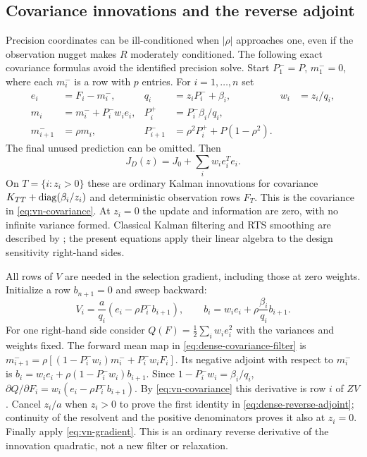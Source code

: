 \subsection{Covariance innovations and the reverse adjoint}
Precision coordinates can be ill-conditioned when $|\rho|$ approaches one,
even if the observation nugget makes $R$ moderately conditioned. The
following exact covariance formulas avoid the identified precision solve.
Start $P_1^-=P$, $m_1^-=0$, where each $m_i^-$ is a row with $p$ entries.
For $i=1,\ldots,n$ set
\begin{align}
 e_i&=F_i-m_i^-,& q_i&=z_iP_i^-+\beta_i,& w_i&=z_i/q_i,\nonumber\\
 m_i&=m_i^-+P_i^-w_i e_i,&
 P_i^+&=P_i^-\beta_i/q_i,\nonumber\\
 m_{i+1}^-&=\rho m_i,&
 P_{i+1}^-&=\rho^2P_i^++P(1-\rho^2).
 \label{eq:dense-covariance-filter}
\end{align}
The final unused prediction can be omitted. Then
\begin{equation}\label{eq:dense-innovation-info}
 J_D(z)=J_0+\sum_i w_i e_i^Te_i.
\end{equation}
On $T=\{i:z_i>0\}$ these are ordinary Kalman innovations for covariance
$K_{TT}+\operatorname{diag}(\beta_i/z_i)$ and deterministic observation rows $F_T$.
This is the covariance in \eqref{eq:vn-covariance}. At $z_i=0$ the update
and information are zero, with no infinite variance formed. Classical Kalman
filtering and RTS smoothing are described by
\citet[Theorems 6.6 and 12.2]{Sarkka2023}; the present equations apply their
linear algebra to the design sensitivity right-hand sides.

All rows of $V$ are needed in the selection gradient, including those at zero
weights. Initialize a row $b_{n+1}=0$ and sweep backward:
\begin{equation}\label{eq:dense-reverse-adjoint}
 V_i=\frac{a}{q_i}(e_i-\rho P_i^-b_{i+1}),\qquad
 b_i=w_ie_i+\rho\frac{\beta_i}{q_i}b_{i+1}.
\end{equation}
For one right-hand side consider
$Q(F)=\frac12\sum_i w_ie_i^2$ with the variances and weights fixed.
The forward mean map in \eqref{eq:dense-covariance-filter} is
$m_{i+1}^-=\rho[(1-P_i^-w_i)m_i^-+P_i^-w_iF_i]$.
Its negative adjoint with respect to $m_i^-$ is
$b_i=w_ie_i+\rho(1-P_i^-w_i)b_{i+1}$.
Since $1-P_i^-w_i=\beta_i/q_i$,
$\partial Q/\partial F_i=w_i(e_i-\rho P_i^-b_{i+1})$.
By \eqref{eq:vn-covariance} this derivative is row $i$ of $ZV$.
Cancel $z_i/a$ when $z_i>0$ to prove the first identity in
\eqref{eq:dense-reverse-adjoint}; continuity of the resolvent and the
positive denominators proves it also at $z_i=0$. Finally apply
\eqref{eq:vn-gradient}. This is an ordinary reverse derivative of the
innovation quadratic, not a new filter or relaxation.

